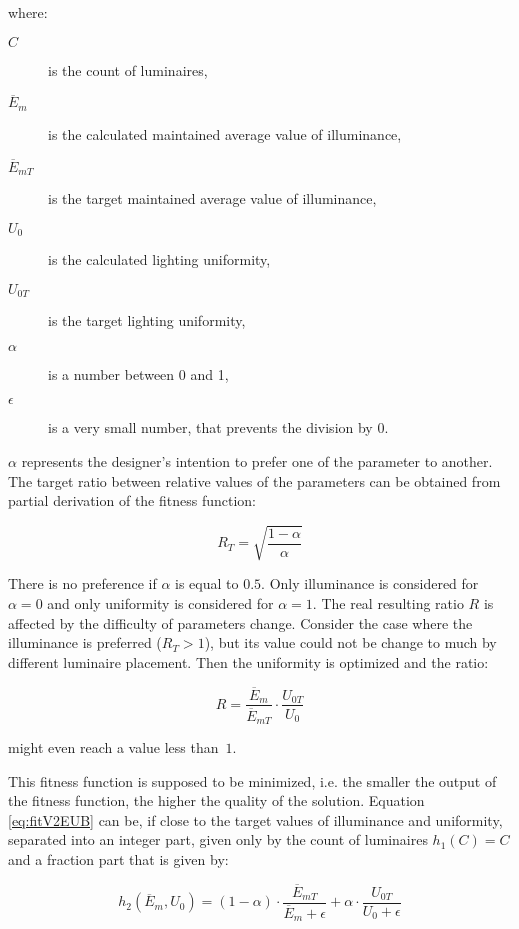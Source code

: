 \noindent where:
\begin{description}
	\item[$C$] is the count of luminaires,
	\item[$\overline{E}_{m}$] is the calculated maintained average value of illuminance,
	\item[$\overline{E}_{mT}$] is the target maintained average value of illuminance,
	\item[$U_0$] is the calculated lighting uniformity,
	\item[$U_{0T}$] is the target lighting uniformity,
	\item[$\alpha$] is a number between 0 and 1,
	\item[$\epsilon$] is a very small number, that prevents the division by 0.
\end{description}

$\alpha$ represents the designer's intention to prefer one of the parameter to another. The target ratio between relative values of the parameters can be obtained from partial derivation of the fitness function:

\begin{equation}
\label{eq:fitV2targetRatio}
R_T =\sqrt{\frac{1-\alpha}{\alpha}}
\end{equation}

\noindent There is no preference if $\alpha$ is equal to $0.5$. Only illuminance is considered for $\alpha = 0$ and only uniformity is considered for $\alpha = 1$. The real resulting ratio $R$ is affected by the difficulty of parameters change. Consider the case where the illuminance is preferred ($R_T > 1$), but its value could not be change to much by different luminaire placement. Then the uniformity is optimized and the ratio:

\begin{equation}
\label{eq:fitV2ratio}
R =\frac{\overline{E}_{m}}{\overline{E}_{mT}}\cdot\frac{U_{0T}}{U_0}
\end{equation}

\noindent might even reach a value less than~$1$. 

This fitness function is supposed to be minimized, i.e. the smaller the output of the fitness function, the higher the quality of the solution. Equation \ref{eq:fitV2EUB} can be, if close to the target values of illuminance and uniformity, separated into an integer part, given only by the count of luminaires $h_1\left(C\right)= C$ and a fraction part that is given by:

\begin{equation}
\label{eq:fitV2frac}
	h_2\left(\overline{E}_{m}, U_0\right)= \left( 1 - \alpha\right)\cdot\frac{\overline{E}_{mT}}{\overline{E}_{m}+\epsilon} + \alpha\cdot\frac{U_{0T}}{U_0 + \epsilon}
\end{equation}

